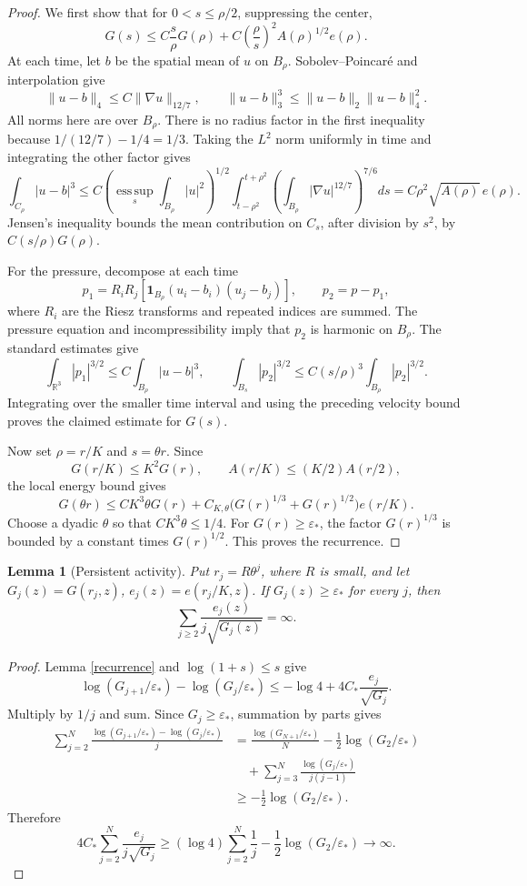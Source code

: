 \documentclass[11pt]{article}
\newtheorem{lemma}[theorem]{Lemma}
\newcommand{\R}{\mathbb R}
\newcommand{\esssup}{\operatorname*{ess\,sup}}
\newcommand{\eps}{\varepsilon_*}
\begin{document}
\begin{proof}
We first show that for \(0<s\leq\rho/2\), suppressing the center,
$$
G(s)\leq C\frac{s}{\rho}G(\rho)
       +C\left(\frac{\rho}{s}\right)^2 A(\rho)^{1/2}e(\rho).
$$
At each time, let \(b\) be the spatial mean of \(u\) on \(B_\rho\).
Sobolev--Poincar\'e and interpolation give
$$
\|u-b\|_4\leq C\|\nabla u\|_{12/7},
\qquad \|u-b\|_3^3\leq\|u-b\|_2\|u-b\|_4^2.
$$
All norms here are over \(B_\rho\). There is no radius factor in the
first inequality because \(1/(12/7)-1/4=1/3\).
Taking the \(L^2\) norm uniformly in time and integrating the other
factor gives
$$
\int_{C_\rho}|u-b|^3
\leq C\left(\esssup_s\int_{B_\rho}|u|^2\right)^{1/2}
 \int_{t-\rho^2}^{t+\rho^2}
       \left(\int_{B_\rho}|\nabla u|^{12/7}\right)^{7/6}ds
=C\rho^2\sqrt{A(\rho)}\,e(\rho).
$$
Jensen's inequality bounds the mean contribution on \(C_s\), after
division by \(s^2\), by \(C(s/\rho)G(\rho)\).

For the pressure, decompose at each time
$$
p_1=R_iR_j[\mathbf1_{B_\rho}(u_i-b_i)(u_j-b_j)],
\qquad p_2=p-p_1,
$$
where \(R_i\) are the Riesz transforms and repeated indices are summed.
The pressure equation and incompressibility imply that \(p_2\) is
harmonic on \(B_\rho\). The standard estimates give
$$
\int_{\R^3}|p_1|^{3/2}\leq C\int_{B_\rho}|u-b|^3,
\qquad
\int_{B_s}|p_2|^{3/2}\leq C(s/\rho)^3\int_{B_\rho}|p_2|^{3/2}.
$$
Integrating over the smaller time interval and using the preceding
velocity bound proves the claimed estimate for \(G(s)\).

Now set \(\rho=r/K\) and \(s=\theta r\). Since
$$
G(r/K)\leq K^2G(r),
\qquad A(r/K)\leq(K/2)A(r/2),
$$
the local energy bound gives
$$
G(\theta r)\leq CK^3\theta G(r)
 +C_{K,\theta}\bigl(G(r)^{1/3}+G(r)^{1/2}\bigr)e(r/K).
$$
Choose a dyadic \(\theta\) so that \(CK^3\theta\leq1/4\).
For \(G(r)\geq\eps\), the factor \(G(r)^{1/3}\) is bounded by a
constant times \(G(r)^{1/2}\). This proves the recurrence.
\end{proof}

\begin{lemma}[Persistent activity]\label{divergence}
Put \(r_j=R\theta^j\), where \(R\) is small, and let
\(G_j(z)=G(r_j,z)\), \(e_j(z)=e(r_j/K,z)\).
If \(G_j(z)\geq\eps\) for every \(j\), then
$$
\sum_{j\geq2}\frac{e_j(z)}{j\sqrt{G_j(z)}}=\infty.
$$
\end{lemma}

\begin{proof}
Lemma \ref{recurrence} and \(\log(1+s)\leq s\) give
$$
\log(G_{j+1}/\eps)-\log(G_j/\eps)
\leq-\log4+4C_*\frac{e_j}{\sqrt{G_j}}.
$$
Multiply by \(1/j\) and sum. Since \(G_j\geq\eps\),
summation by parts gives
$$
\begin{aligned}
\sum_{j=2}^N\frac{\log(G_{j+1}/\eps)-\log(G_j/\eps)}{j}
&=\frac{\log(G_{N+1}/\eps)}{N}
 -\frac12\log(G_2/\eps)\\
&\quad+\sum_{j=3}^N\frac{\log(G_j/\eps)}{j(j-1)}\\
&\geq-\frac12\log(G_2/\eps).
\end{aligned}
$$
Therefore
$$
4C_*\sum_{j=2}^N\frac{e_j}{j\sqrt{G_j}}
\geq(\log4)\sum_{j=2}^N\frac1j-\frac12\log(G_2/\eps)
\longrightarrow\infty.
$$
\end{proof}
\end{document}
